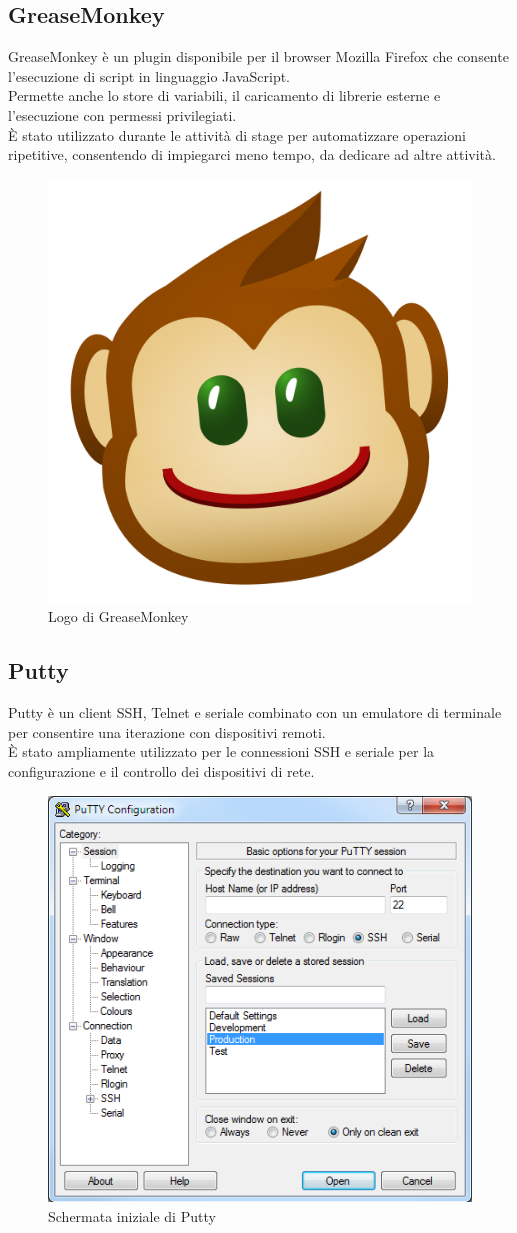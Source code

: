 \documentclass[Tesi.tex]{subfiles}
\begin{document}
\subsection{GreaseMonkey}
GreaseMonkey è un plugin disponibile per il browser Mozilla Firefox che consente l'esecuzione di script in linguaggio JavaScript. \\
Permette anche lo store di variabili, il caricamento di librerie esterne e l'esecuzione con permessi privilegiati. \\
\`{E} stato utilizzato durante le attività di stage per automatizzare operazioni ripetitive, consentendo di impiegarci meno tempo, da dedicare ad altre attività.
\begin{figure}[H]
	\centering
	\includegraphics[width=0.18\linewidth]{"images/logo/GreaseMonkey_logo"}
	\caption{Logo di GreaseMonkey}
	\label{fig:Logo di GreaseMonkey}
\end{figure}

\subsection{Putty}
Putty è un client SSH, Telnet e seriale combinato con un emulatore di terminale per consentire una iterazione con dispositivi remoti. \\
\`{E} stato ampliamente utilizzato per le connessioni SSH e seriale per la configurazione e il controllo dei dispositivi di rete.
\begin{figure}[H]
	\centering
	\includegraphics[width=0.55\linewidth]{"images/putty"}
	\caption{Schermata iniziale di Putty}
	\label{fig:Schermata iniziale di Putty}
\end{figure}
\end{document}
